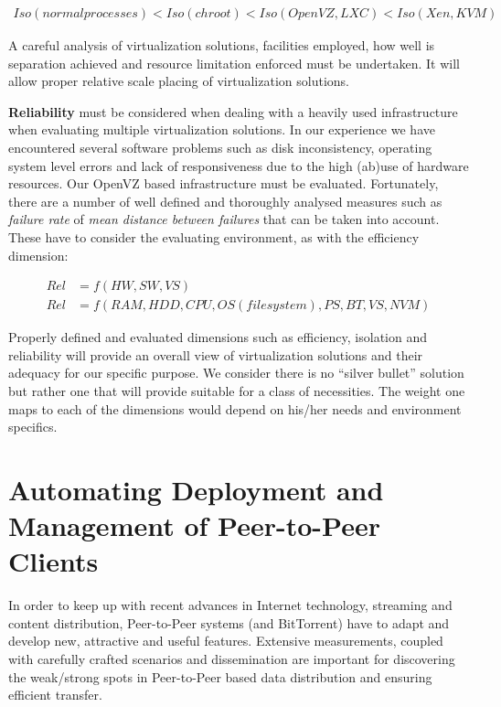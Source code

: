 \begin{align}
Iso(normal processes) < Iso(chroot) < Iso(OpenVZ, LXC) < Iso(Xen,KVM)
\end{align}

A careful analysis of virtualization solutions, facilities employed, how well
is separation achieved and resource limitation enforced must be undertaken. It
will allow proper relative scale placing of virtualization solutions.

\textbf{Reliability} must be considered when dealing with a heavily used
infrastructure when evaluating multiple virtualization solutions. In our
experience we have encountered several software problems such as disk
inconsistency, operating system level errors and lack of responsiveness due to
the high (ab)use of hardware resources. Our OpenVZ based infrastructure must
be evaluated. Fortunately, there are a number of well defined and thoroughly
analysed measures such as \textit{failure rate} of \textit{mean distance
between failures} that can be taken into account. These have to consider the
evaluating environment, as with the efficiency dimension:

\begin{align}
Rel & = f(HW, SW, VS)\\
Rel & = f(RAM, HDD, CPU, OS (filesystem), PS, BT, VS, NVM)
\end{align}

Properly defined and evaluated dimensions such as efficiency, isolation and
reliability will provide an overall view of virtualization solutions and their
adequacy for our specific purpose. We consider there is no ``silver bullet''
solution but rather one that will provide suitable for a class of necessities.
The weight one maps to each of the dimensions would depend on his/her needs
and environment specifics.

\section{Automating Deployment and Management of Peer-to-Peer Clients}
\label{sec:virt-infra:auto-deploy}

In order to keep up with recent advances in Internet technology, streaming and
content distribution, Peer-to-Peer systems (and BitTorrent) have to adapt and
develop new, attractive and useful features. Extensive measurements, coupled
with carefully crafted scenarios and dissemination are important for
discovering the weak/strong spots in Peer-to-Peer based data distribution and
ensuring efficient transfer.

